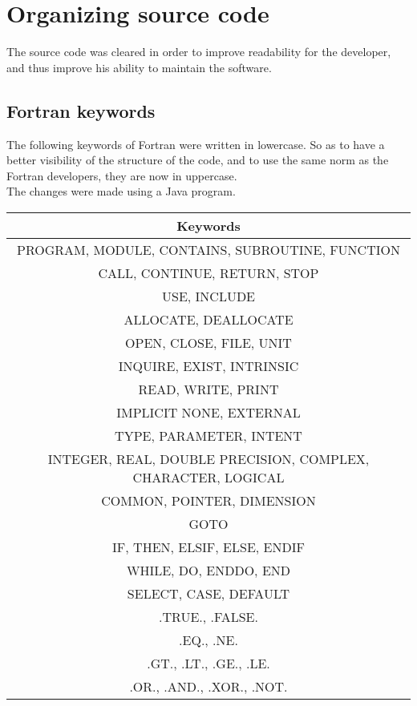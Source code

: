 \section{Organizing source code}
The source code was cleared in order to improve readability for the developer, and thus improve his ability to maintain the software.

\newpage
\subsection{Fortran keywords}
The following keywords of Fortran were written in lowercase. So as to have a better visibility of the structure of the code, and to use the same norm as the Fortran developers, they are now in uppercase.
\\The changes were made using a Java program.

\begin{center}
\begin{tabular}{ | c | }
\hline 
\textbf{Keywords} \\

\hline 
PROGRAM, MODULE, CONTAINS, SUBROUTINE, FUNCTION \\
CALL, CONTINUE, RETURN, STOP \\
USE, INCLUDE \\
ALLOCATE, DEALLOCATE \\
OPEN, CLOSE, FILE, UNIT \\
INQUIRE, EXIST, INTRINSIC \\
READ, WRITE, PRINT \\

\hline 
IMPLICIT NONE, EXTERNAL \\
TYPE, PARAMETER, INTENT \\
INTEGER, REAL, DOUBLE PRECISION, COMPLEX, CHARACTER, LOGICAL \\
COMMON, POINTER, DIMENSION \\

\hline 
GOTO \\
IF, THEN, ELSIF, ELSE, ENDIF \\
WHILE, DO, ENDDO, END \\
SELECT, CASE, DEFAULT \\

\hline
.TRUE., .FALSE. \\
.EQ., .NE. \\
.GT., .LT., .GE., .LE. \\
.OR., .AND., .XOR., .NOT. \\

\hline
\end{tabular}
\end{center}

